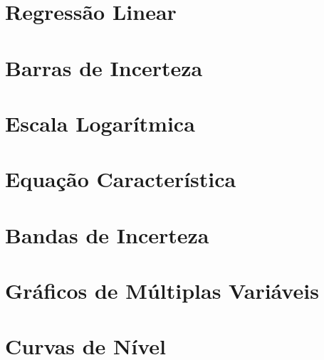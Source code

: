 \documentclass{article}
\begin{document}
    \section{Regressão Linear} \label{sec:regres}
        

    \section{Barras de Incerteza} \label{sec:incert}
        

    \section{Escala Logarítmica} \label{sec:escala}
        

    \section{Equação Característica} \label{sec:caract}

    \section{Bandas de Incerteza} \label{sec:bandas}

    \section{Gráficos de Múltiplas Variáveis} \label{sec:multiv}

    \section{Curvas de Nível} \label{sec:contorno}
\end{document}
